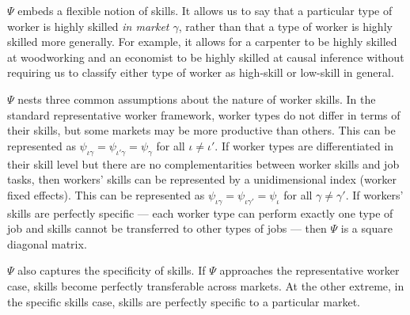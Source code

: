 \documentclass[12pt]{article}
\def\ig{\iota\gamma}
\def\g{\gamma}
\def\i{\iota}
\theoremstyle{definition}
\theoremstyle{plain}
\begin{document}
$\Psi$ embeds a flexible notion of skills. It allows us to say that a particular type of worker is highly skilled \emph{in market $\g$}, rather than that a type of worker is highly skilled more generally. For example, it allows for a carpenter to be highly skilled at woodworking and an economist to be highly skilled at causal inference without requiring us to classify either type of worker as high-skill or low-skill in general. 

$\Psi$ nests three common assumptions about the nature of worker skills. In the standard representative worker framework, worker types do not differ in terms of their skills, but some markets may be more productive than others. This can be represented as $\psi_{\ig} = \psi_{\i'\g} = \psi_{\g}$ for all $\i\neq\i'$. If worker types are differentiated in their skill level but there are no complementarities between worker skills and job tasks, then workers' skills can be represented by a unidimensional index (worker fixed effects). This can be represented as $\psi_{\ig} = \psi_{\ig'} = \psi_{\i}$ for all $\g\neq\g'$. If workers' skills are perfectly specific --- each worker type can perform exactly one type of job and skills cannot be transferred to other types of jobs --- then $\Psi$ is a square diagonal matrix.  $\Psi$ also captures the specificity of skills. If $\Psi$ approaches the representative worker case, skills become perfectly transferable across markets. At the other extreme, in the specific skills case, skills are perfectly specific to a particular market.
\end{document}
